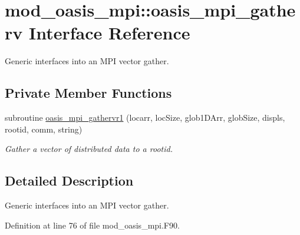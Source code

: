 \hypertarget{interfacemod__oasis__mpi_1_1oasis__mpi__gatherv}{\section{mod\+\_\+oasis\+\_\+mpi\+:\+:oasis\+\_\+mpi\+\_\+gatherv Interface Reference}
\label{interfacemod__oasis__mpi_1_1oasis__mpi__gatherv}
}


Generic interfaces into an M\+P\+I vector gather.  


\subsection*{Private Member Functions}
\begin{DoxyCompactItemize}
\item 
subroutine \hyperlink{interfacemod__oasis__mpi_1_1oasis__mpi__gatherv_a8d17b5a337d8ebec5160dfb891c6a715}{oasis\+\_\+mpi\+\_\+gathervr1} (locarr, loc\+Size, glob1\+D\+Arr, glob\+Size, displs, rootid, comm, string)
\begin{DoxyCompactList}\small\item\em Gather a vector of distributed data to a rootid. \end{DoxyCompactList}\end{DoxyCompactItemize}


\subsection{Detailed Description}
Generic interfaces into an M\+P\+I vector gather. 

Definition at line 76 of file mod\+\_\+oasis\+\_\+mpi.\+F90.



